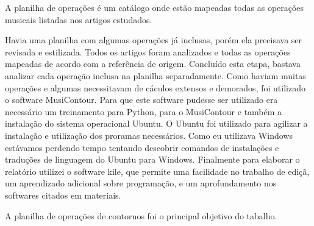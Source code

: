 \documentclass[11pt]{article}
\begin{document}
A planilha de operações é um catálogo onde estão mapeadas todas as
operações musicais listadas nos artigos estudados.

Havia uma planilha com algumas operações já inclusas, porém ela
precisava ser revisada e estilizada.
Todos os artigos foram analizados e todas as operações mapeadas de
acordo com a referência de origem.  Concluído esta etapa, bastava
analizar cada operação inclusa na planilha separadamente. Como haviam
muitas operações e algumas necessitavam de cáculos extensos e
demorados, foi utilizado o software MusiContour.  Para que este
software pudesse ser utilizado era necessário um treinamento para
Python, para o MusiContour e também a instalação do sistema
operacional Ubuntu. O Ubuntu foi utilizado para agilizar a instalação
e utilização dos proramas necessários. Como eu utilizava Windows
estávamos perdendo tempo tentando descobrir comandos de instalações e
traduções de linguagem do Ubuntu para Windows.  Finalmente para
elaborar o relatório utilizei o software kile, que permite uma
facilidade no trabalho de ediçã, um aprendizado adicional sobre
programação, e um aprofundamento nos softwares citados em materiais.

\label{sec:resultados}



A planilha de operações de contornos foi o principal objetivo do
tabalho.
\end{document}
